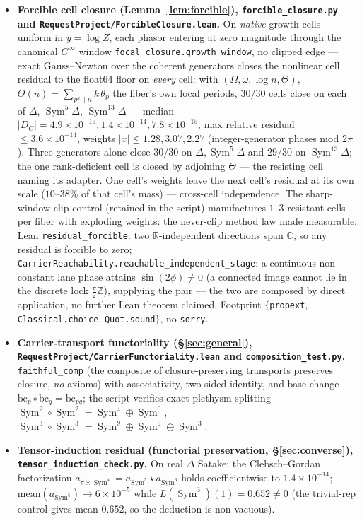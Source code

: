 \documentclass[11pt]{article}
\theoremstyle{definition}
\newcommand{\Sym}{\operatorname{Sym}}
\begin{document}
\begin{itemize}
\item \textbf{Forcible cell closure (Lemma~\ref{lem:forcible}), \texttt{forcible\_closure.py} and \texttt{RequestProject/ForcibleClosure.lean}.} On \emph{native} growth cells --- uniform in $y=\log Z$, each phasor entering at zero magnitude through the canonical $C^{\infty}$ window \texttt{focal\_closure.growth\_window}, no clipped edge --- exact Gauss--Newton over the coherent generators closes the nonlinear cell residual to the float64 floor on \emph{every} cell: with $(\Omega,\omega,\log n,\Theta)$, $\Theta(n)=\sum_{p^k\|n}k\,\theta_p$ the fiber's own local periods, $30/30$ cells close on each of $\Delta$, $\Sym^5\Delta$, $\Sym^{13}\Delta$ --- median $|D_C|=4.9\times10^{-15},1.4\times10^{-14},7.8\times10^{-15}$, max relative residual $\le3.6\times10^{-14}$, weights $|x|\le1.28,3.07,2.27$ (integer-generator phases mod $2\pi$). Three generators alone close $30/30$ on $\Delta,\Sym^5\Delta$ and $29/30$ on $\Sym^{13}\Delta$; the one rank-deficient cell is closed by adjoining $\Theta$ --- the resisting cell naming its adapter. One cell's weights leave the next cell's residual at its own scale ($10$--$38\%$ of that cell's mass) --- cross-cell independence. The sharp-window clip control (retained in the script) manufactures $1$--$3$ resistant cells per fiber with exploding weights: the never-clip method law made measurable. Lean \texttt{residual\_forcible}: two $\mathbb R$-independent directions span $\mathbb C$, so any residual is forcible to zero; \texttt{CarrierReachability.reachable\_independent\_stage}: a continuous non-constant lane phase attains $\sin(2\phi)\neq0$ (a connected image cannot lie in the discrete lock $\tfrac{\pi}{2}\mathbb Z$), supplying the pair --- the two are composed by direct application, no further Lean theorem claimed. Footprint $\{$\texttt{propext}, \texttt{Classical.choice}, \texttt{Quot.sound}$\}$, no \texttt{sorry}.

\item \textbf{Carrier-transport functoriality (\S\ref{sec:general}), \texttt{RequestProject/CarrierFunctoriality.lean} and \texttt{composition\_test.py}.} \texttt{faithful\_comp} (the composite of closure-preserving transports preserves closure, \emph{no} axioms) with associativity, two-sided identity, and base change $\mathrm{bc}_p\circ\mathrm{bc}_q=\mathrm{bc}_{pq}$; the script verifies exact plethysm splitting $\Sym^2\!\circ\Sym^2=\Sym^4\oplus\Sym^0$, $\Sym^3\!\circ\Sym^3=\Sym^9\oplus\Sym^5\oplus\Sym^3$.

\item \textbf{Tensor-induction residual (functorial preservation, \S\ref{sec:converse}), \texttt{tensor\_induction\_check.py}.} On real $\Delta$ Satake: the Clebsch--Gordan factorization $a_{\pi\times\Sym^4}=a_{\Sym^5}\!\star a_{\Sym^3}$ holds coefficientwise to $1.4\times10^{-14}$; $\mathrm{mean}(a_{\Sym^5})\to6\times10^{-5}$ while $L(\Sym^3)(1)=0.652\ne0$ (the trivial-rep control gives mean $0.652$, so the deduction is non-vacuous).
\end{itemize}
\end{document}
